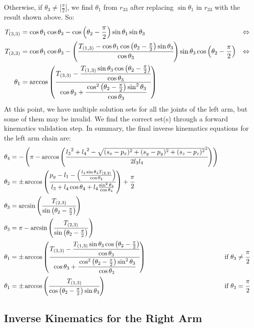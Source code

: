 Otherwise, if $\theta_3 \neq \left|\frac{\pi}{2}\right|$, we find $\theta_1$ from $r_{33}$ after replacing $\sin\theta_1$ in $r_{33}$ with the result shown above. So:
\begin{align*}
T_{(3,3)} &= \cos\theta_1\cos\theta_3 - \cos\left(\theta_2 - \frac{\pi}{2}\right)\sin\theta_1\sin\theta_3 &\Leftrightarrow \\
T_{(3,3)} &= \cos\theta_1\cos\theta_3 - \left(\cfrac{T_{(1,3)} - \cos\theta_1\cos\left(\theta_2 - \frac{\pi}{2}\right)\sin\theta_3}{\cos\theta_3}\right)\sin\theta_3\cos\left(\theta_2 - \frac{\pi}{2}\right) &\Leftrightarrow \\
\theta_1 &= \arccos\left(\cfrac{T_{(3,3)} -\cfrac{ T_{(1,3)}\sin\theta_3\cos\left(\theta_2 - \frac{\pi}{2}\right)}{\cos\theta_3}}{\cos\theta_3 + \cfrac{\cos^2\left(\theta_2-\frac{\pi}{2}\right)\sin^2\theta_3}{\cos\theta_3}}\right)
\end{align*}
At this point, we have multiple solution sets for all the joints of the left arm, but some of them may be invalid. We find the correct set(s) through a forward kinematics validation step. In summary, the final inverse kinematics equations for the left arm chain are:
\begin{align*}
\theta_4 &= -\left(\pi - \arccos\left(\cfrac{{l_3}^2 + {l_4}^2 - \sqrt{(s_x-p_x)^2 + (s_y-p_y)^2 + (s_z-p_z)^2}^2 }{2 l_3 l_4}\right)\right)\\
\theta_2 &= \pm\arccos\left(\cfrac{p_y - l_1 - \left(\frac{l_4\sin\theta_4 T_{(2,2)}}{\cos\theta_4}\right)}{l_3 +l_4\cos\theta_4 + l_4\frac{\sin^2\theta_4}{\cos\theta_4}}\right)+\cfrac{\pi}{2}\\
\theta_3 &= \arcsin\left(\cfrac{T_{(2,3)}}{\sin\left(\theta_2-\frac{\pi}{2}\right)}\right)\\
\theta_3 &= \pi - \arcsin\left(\frac{T_{(2,3)}}{\sin\left(\theta_2-\frac{\pi}{2}\right)}\right)\\
\theta_1 &= \pm\arccos\left(\cfrac{T_{(3,3)} - \cfrac{T_{(1,3)}\sin\theta_3\cos\left(\theta_2 - \frac{\pi}{2}\right)}{\cos\theta_3}}{\cos\theta_3 + \cfrac{\cos^2\left(\theta_2-\frac{\pi}{2}\right)\sin^2\theta_3}{\cos\theta_3}}\right) &\text{if } \theta_3 \neq \cfrac{\pi}{2}\\
\theta_1 &= \pm\arccos\left(\cfrac{T_{(1,3)}}{\cos\left(\theta_2 - \frac{\pi}{2}\right)\sin\theta_3}\right) &\text{if } \theta_3 = \cfrac{\pi}{2}
\end{align*}



\subsection{Inverse Kinematics for the Right Arm}

